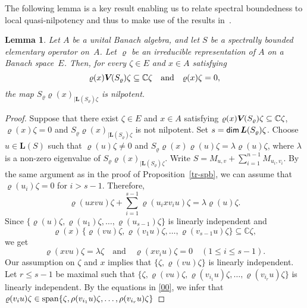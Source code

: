 \documentclass[a4paper,12pt,reqno]{amsart}
\numberwithin{equation}{section}
\newtheorem{lem}[thm]{Lemma}
\theoremstyle{definition}
\begin{document}
The following lemma is a key result enabling us to relate spectral boundedness to local quasi-nilpotency and thus to make use
of the results in~\cite{NaMa13}.

\begin{lem}\label{spb-nilp}
Let $A$ be a unital Banach algebra, and let $S$ be  a spectrally bounded  elementary operator on~$A$.
Let $\varrho$ be an irreducible representation  of $A$ on a Banach space~$E$.
Then, for every $\zeta \in E$ and $x\in A$ satisfying
\begin{equation*}
\varrho(x){{\bm V\mkern-2.5mu(S_\varrho)}}\zeta \subseteq\mathbb C \zeta \quad \text{and} \quad \varrho (x)\zeta=0,
\end{equation*}
the map $S_\varrho\varrho(x)_{|{{\bm L(S_\varrho)}}\zeta}$ is nilpotent.
\end{lem}
\begin{proof}
Suppose that there exist $\zeta\in E$ and $x\in A$ satisfying $\varrho(x){{\bm V\mkern-2.5mu(S_\varrho)}}\zeta\subseteq {\mathbb{C}} \zeta$, $\varrho(x)\zeta=0$ and
$S_\varrho\varrho(x)_{|{{\bm L(S_\varrho)}}\zeta}$ is not nilpotent.  Set $s= {{\sf dim}\,}{{\bm L(S_\varrho)}}\zeta$.
Choose $u \in {{\bm L(S)}}$ such that $\varrho (u) \zeta \neq 0$ and $S_\varrho\varrho(x)\varrho(u)\zeta= \lambda\varrho(u)\zeta$,
where $\lambda$ is a non-zero eigenvalue of $S_\varrho\varrho(x)_{|{{\bm L(S_\varrho)}}\zeta}$.
Write $S= M_{u,v}+ \sum_{i=1}^{n-1} M_{u_i,v_i}$.
By the same argument as in the proof of Proposition~\ref{tr-spb}, we can assume that $\varrho(u_i) \zeta=0$ for $i > s-1$.  Therefore,
\begin{equation*}
\varrho (uxvu) \zeta +\sum_{i=1}^{s-1} \varrho(u_i xv_iu )\zeta = \lambda \varrho( u) \zeta.
\end{equation*}
Since $\{\varrho (u) \zeta, \varrho (u_1) \zeta,\ldots, \varrho(u_{s-1}) \zeta   \}$ is linearly independent and
\[
\varrho(x)\,\{\varrho(vu)\zeta,\varrho(v_1u)\zeta,\ldots,\varrho(v_{s-1}u)\zeta\}\subseteq{\mathbb{C}}\zeta,
\]
we get
\begin{equation}\label{00}
\varrho (xvu ) \zeta= \lambda \zeta  \quad \text{and} \quad \varrho (xv_i u) \zeta=0\quad(1 \leq i \leq s-1).
\end{equation}
Our assumption on $\zeta$ and $x$ implies that  $\{\zeta, \varrho (vu) \zeta \}$ is linearly independent.
Let $r\leq s-1$ be maximal such that
$\{\zeta, \varrho (vu) \zeta, \varrho( v_{i_1}u ) \zeta, \ldots, \varrho (v_{i_r}u )\zeta\}$ is linearly independent.
By the equations in \eqref{00}, we  infer that
$\varrho (v_iu )\zeta \in {{\rm span}} \{\zeta, \rho (v_{i_1}u) \zeta, \ldots,\rho (v_{i_r}u )\zeta \}$

\end{proof}
\end{document}
